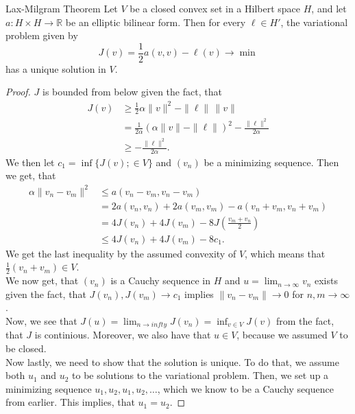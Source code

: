 \begin{thmx}{Lax-Milgram Theorem}
Let $V$ be a closed convex set in a Hilbert space $H$, and let $a:H \times H \rightarrow \mathbb{R}$ be an elliptic bilinear form. Then for every $\ell\in H'$, the variational problem given by
\[
    J(v)=\frac{1}{2} a(v,v) - \ell(v) \longrightarrow \min    
\]
has a unique solution in $V$.
\end{thmx}

\begin{proof}
    $J$ is bounded from below given the fact, that
    \begin{align*}
        J(v) &\geq \frac{1}{2} \alpha \|v\|^2 - \|\ell\| \, \|v\|\\
        &= \frac{1}{2\alpha} {(\alpha \|v\|-\|\ell\|)}^2 - \frac{\|\ell\|^2}{2\alpha} \\
        &\geq - \frac{\|\ell\|^2}{2\alpha}.
    \end{align*}
    We then let $c_1 = \inf\{J(v); \in V\}$ and $(v_n)$ be a minimizing sequence. Then we get, that 
    \begin{align*}
        \alpha \|v_n-v_m\|^2 &\leq a(v_n-v_m,v_n-v_m) \\
        &= 2a(v_n,v_n) + 2a(v_m,v_m) - a (v_n+v_m,v_n+v_m) \\
        &= 4J(v_n) + 4J(v_m) - 8J(\frac{v_m+v_n}{2}) \\
        &\leq 4J(v_n) + 4J(v_m) - 8c_1. 
    \end{align*}
    We get the last inequality by the assumed convexity of $V$, which means that $\frac{1}{2}(v_n + v_m) \in V$. 
    \\
    We now get, that $(v_n)$ is a Cauchy sequence in $H$ and $u = \lim_{n\rightarrow \infty}v_n$ exists given the fact, that $J(v_n),J(v_m)\rightarrow c_1$ implies $\|v_n - v_m\| \rightarrow 0$ for $n,m\rightarrow \infty$.  
    \\
    Now, we see that $J(u) = \lim_{n\rightarrow infty} J(v_n) = \inf_{v\in V} J(v)$ from the fact, that $J$ is continious. Moreover, we also have that $u\in V$, because we assumed $V$ to be closed. 
    \\
    Now lastly, we need to show that the solution is unique. To do that, we assume both $u_1$ and $u_2$ to be solutions to the variational problem. 
    Then, we set up a minimizing sequence $u_1,u_2,u_1,u_2,\ldots$, which we know to be a Cauchy sequence from earlier. This implies, that $u_1 = u_2$.
\end{proof}